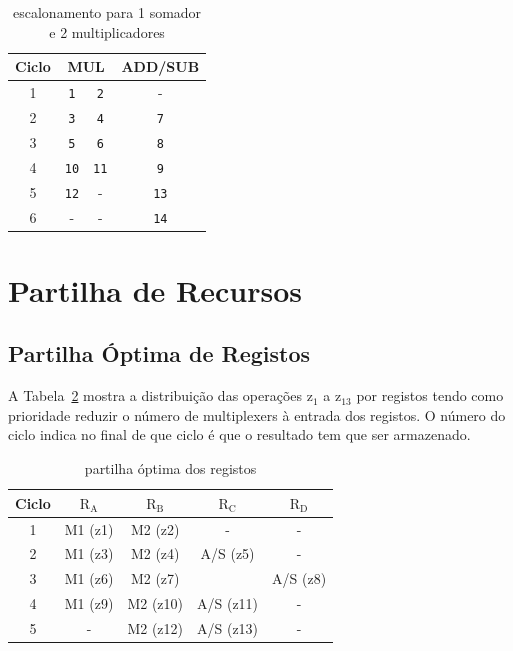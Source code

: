 \documentclass[a4paper]{article}
\begin{document}
\begin{table}[H]
	\centering
	\begin{tabular}{|c||c|c|c|}
		\hline 
		Ciclo & \multicolumn{2}{c|}{MUL} & ADD/SUB \\ 
		\hline
		\hline 
		1 & \texttt{1} & \texttt{2} & - \\ 
		\hline 
		2 & \texttt{3} & \texttt{4} & \texttt{7} \\ 
		\hline 
		3 & \texttt{5} & \texttt{6} & \texttt{8} \\ 
		\hline 
		4 & \texttt{10} & \texttt{11} & \texttt{9} \\ 
		\hline 
		5 & \texttt{12} & - & \texttt{13} \\ 
		\hline 
		6 & - & - & \texttt{14} \\ 
		\hline 
	\end{tabular} 
	\caption{escalonamento para 1 somador \\
		e 2 multiplicadores}
	\label{tab:escalonamento2M1AS}
\end{table}


\section{Partilha de Recursos}
\subsection{Partilha Óptima de Registos}
\label{subsec:partilha_optim_registos}

A Tabela~\ref{tab:binding_optim_reg} mostra a distribuição das operações $\mathrm{z_1}$ a $\mathrm{z_{13}}$ por registos tendo como prioridade reduzir o número de multiplexers à entrada dos registos. O número do ciclo indica no final de que ciclo é que o resultado tem que ser armazenado.

\begin{table}[H]
	\centering
	\begin{tabular}{|c||c|c|c|c|}
		\hline 
		Ciclo & $\mathrm{R_A}$ & $\mathrm{R_B}$ & $\mathrm{R_C}$ & $\mathrm{R_D}$ \\ 
		\hline 
		\hline
		1 & M1 (z1) & M2 (z2) & - & - \\ 
		\hline 
		2 & M1 (z3) & M2 (z4) & A/S (z5) & - \\ 
		\cline{1-3}\cline{5-5}
		3 & M1 (z6) & M2 (z7) &	 & A/S (z8) \\ 
		\hline 
		4 & M1 (z9) & M2 (z10) & A/S (z11) & - \\ 
		\hline 
		5 & - & M2 (z12) & A/S (z13) & - \\ 
		\hline 
	\end{tabular}
	\caption{partilha óptima dos registos}
	\label{tab:binding_optim_reg}
\end{table}
\end{document}
